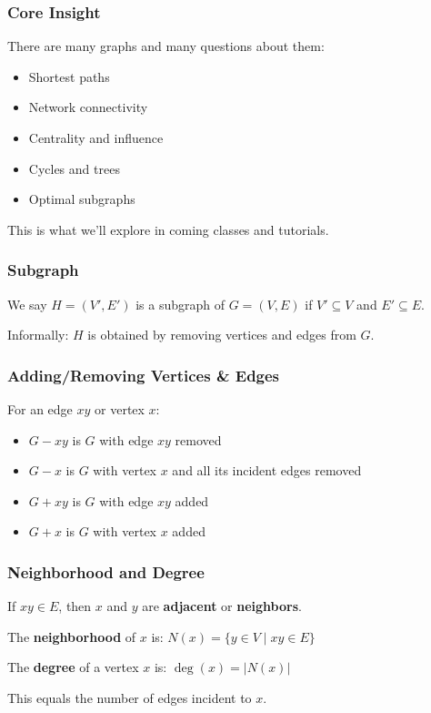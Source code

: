 \documentclass{beamer}
\begin{document}
\begin{frame}
  \frametitle{Core Insight}
  
  There are many graphs and many questions about them:
  \begin{itemize}
    \item Shortest paths
    \item Network connectivity
    \item Centrality and influence
    \item Cycles and trees
    \item Optimal subgraphs
  \end{itemize}
  
  \vspace{0.3cm}
  
  This is what we'll explore in coming classes and tutorials.
\end{frame}

\begin{frame}
  \frametitle{Subgraph}
  
  \begin{definition}
    We say $H = (V', E')$ is a subgraph of $G = (V, E)$ if $V' \subseteq V$ and $E' \subseteq E$.
  \end{definition}
  
  \vspace{0.3cm}
  
  Informally: $H$ is obtained by removing vertices and edges from $G$.
\end{frame}

\begin{frame}
  \frametitle{Adding/Removing Vertices \& Edges}
  
  \begin{definition}
    For an edge $xy$ or vertex $x$:
    \begin{itemize}
      \item $G - xy$ is $G$ with edge $xy$ removed
      \item $G - x$ is $G$ with vertex $x$ and all its incident edges removed
      \item $G + xy$ is $G$ with edge $xy$ added
      \item $G + x$ is $G$ with vertex $x$ added
    \end{itemize}
  \end{definition}
\end{frame}

\begin{frame}
  \frametitle{Neighborhood and Degree}
  
  \begin{definition}
    If $xy \in E$, then $x$ and $y$ are \textbf{adjacent} or \textbf{neighbors}.
    
    The \textbf{neighborhood} of $x$ is: $N(x) = \{y \in V \mid xy \in E\}$
  \end{definition}
  
  \begin{definition}
    The \textbf{degree} of a vertex $x$ is: $\deg(x) = |N(x)|$
    
    This equals the number of edges incident to $x$.
  \end{definition}
\end{frame}
\end{document}
